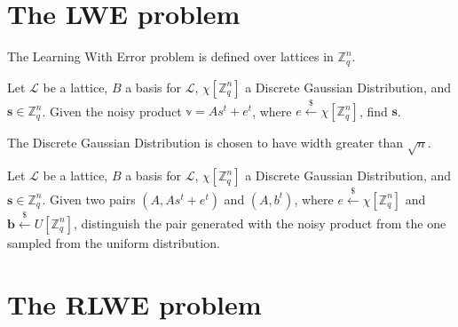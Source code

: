 \section{The LWE problem}
The Learning With Error problem is defined over lattices in $\mathbb{Z}_q^n$. 

\begin{definition}
Let $\mathscr{L}$ be a lattice, $B$ a basis for $\mathscr{L}$, $\chi[\mathbb{Z}_q^n]$ a Discrete Gaussian Distribution, and $\mathbf{s}\in\mathbb{Z}_q^n$. Given the noisy product $\mathbb{v}=As^t + e^t$, where $e\xleftarrow{\$}\chi[\mathbb{Z}_q^n]$, find $\mathbf{s}$.
\end{definition}

\begin{remark}
The Discrete Gaussian Distribution is chosen to have width greater than $\sqrt{n}$.
\end{remark}

\begin{definition}
Let $\mathscr{L}$ be a lattice, $B$ a basis for $\mathscr{L}$, $\chi[\mathbb{Z}_q^n]$ a Discrete Gaussian Distribution, and $\mathbf{s}\in\mathbb{Z}_q^n$. Given two pairs $(A, As^t+e^t)$ and $(A,b^t)$, where $e\xleftarrow{\$}\chi[\mathbb{Z}_q^n]$ and $\mathbf{b}\xleftarrow{\$}U[\mathbb{Z}_q^n]$, distinguish the pair generated with the noisy product from the one sampled from the uniform distribution.
\end{definition}





\section{The RLWE problem}



